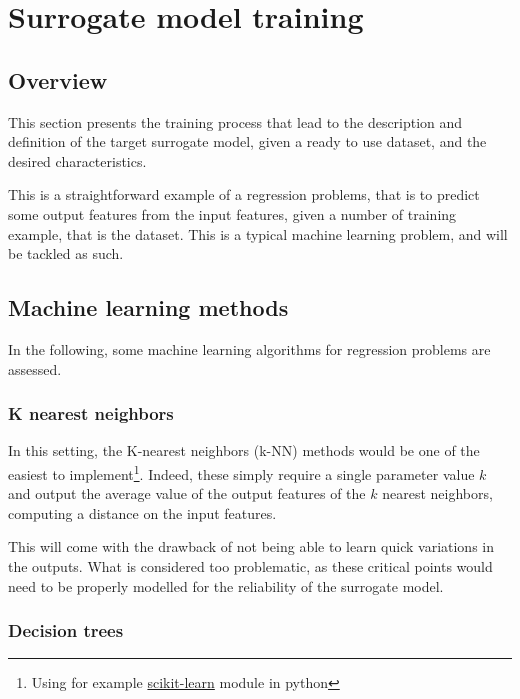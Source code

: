 \section{Surrogate model training}

\subsection{Overview}

This section presents the training process that lead to the description and definition of the target surrogate model, given a ready to use dataset, and the desired characteristics.

This is a straightforward example of a regression problems, that is to predict some output features from the input features, given a number of training example, that is the dataset. This is a typical machine learning problem, and will be tackled as such.

\subsection{Machine learning methods}

In the following, some machine learning algorithms for regression problems \cite{machine-learning-class} are assessed.

\subsubsection{K nearest neighbors}

In this setting, the K-nearest neighbors (k-NN) methods would be one of the easiest to implement\footnote{Using for example \href{https://scikit-learn.org/stable/modules/neighbors.html\#nearest-neighbors-regression}{scikit-learn}\cite{scikit-learn} module in python}. Indeed, these simply require a single parameter value $k$ and output the average value of the output features of the $k$ nearest neighbors, computing a distance on the input features.

This will come with the drawback of not being able to learn quick variations in the outputs. What is considered too problematic, as these critical points would need to be properly modelled for the reliability of the surrogate model.

\subsubsection{Decision trees}

